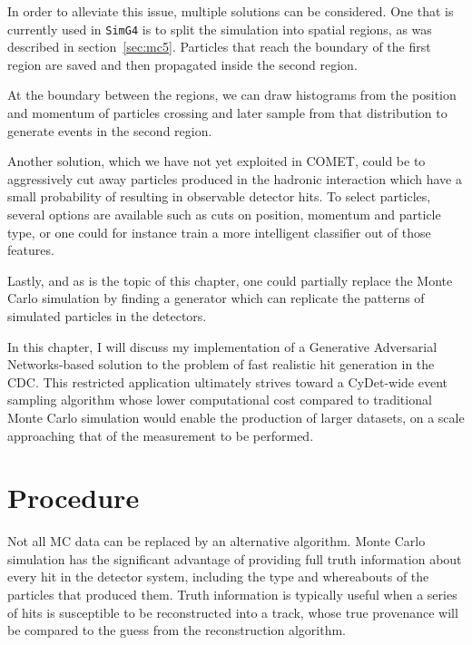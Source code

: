 In order to alleviate this issue, multiple solutions can be considered. One that is currently used in \texttt{SimG4} is to split the simulation into spatial regions, as was described in section~\ref{sec:mc5}. Particles that reach the boundary of the first region are saved and then propagated inside the second region. 


At the boundary between the regions, we can draw histograms from the position and momentum of particles crossing and later sample from that distribution to generate events in the second region.

Another solution, which we have not yet exploited in COMET, could be to aggressively cut away particles produced in the hadronic interaction which have a small probability of resulting in observable detector hits. To select particles, several options are available such as cuts on position, momentum and particle type, or one could for instance train a more intelligent classifier out of those features.

Lastly, and as is the topic of this chapter, one could partially replace the Monte Carlo simulation by finding %
a generator which can replicate the patterns of simulated particles in the detectors.

In this chapter, I will discuss my implementation of a Generative Adversarial Networks-based solution to the problem of fast realistic hit generation in the CDC. This restricted application ultimately strives toward a CyDet-wide event sampling algorithm whose lower computational cost compared to traditional Monte Carlo simulation would enable the production of larger datasets, on a scale approaching that of the measurement to be performed.

\section{Procedure}
Not all MC data can be replaced by an alternative algorithm. Monte Carlo simulation has the significant advantage of providing full truth information about every hit in the detector system, including the type and whereabouts of the particles that produced them.
Truth information is typically useful when a series of hits is susceptible to be reconstructed into a track, whose true provenance will be compared to the guess from the reconstruction algorithm. %

